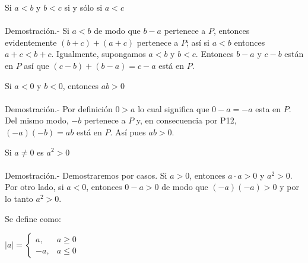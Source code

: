 \begin{teo}
Si $a<b$ y $b<c$ si y sólo si  $a<c$\\\\
Demostración.- \; Si $a<b$ de modo que $b-a$ pertenece a $P$, entonces evidentemente $(b+c)+(a+c)$ pertenece a $P$; así si $a<b$ entonces $a+c<b+c$. Igualmente, supongamos $a<b$ y $b<c$. Entonces $b-a$ y $c-b$ están en $P$ así que $(c-b)+(b-a)=c-a$ está en $P$.
\end{teo}

\begin{teo}
Si $a<0$ y $b<0$, entonces $ab>0$\\\\
Demostración.- \; Por definición $0>a$ lo cual significa que $0-a=-a$ esta en $P$. Del mismo modo, $-b$ pertenece a $P$ y, en consecuencia por P12, $(-a)(-b)=ab$ está en $P$. Así pues $ab>0$. 
\end{teo}

\begin{teo}
Si $a\neq0$ es $a^2>0$\\\\
Demostración.-\; Demostraremos por casos. Si $a>0$, entonces  \; $a\cdot a >0$ \; y \; $a^2>0$. Por otro lado, si $a<0$, entonces $0-a>0$ de modo que $(-a)(-a)>0$ \; y por lo tanto \; $a^2>0$.
\end{teo}

\begin{def.} Se define como:
\begin{center}
$|a| = \left\lbrace
\begin{array}{rr}
a, & a\geq 0\\
-a, & a \leq 0
\end{array}
\right.$\\
\end{center}
\end{def.}

